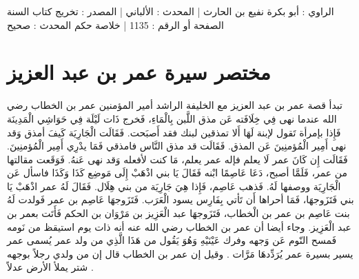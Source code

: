 الراوي : أبو بكرة نفيع بن الحارث | المحدث : الألباني | المصدر : تخريج كتاب السنة
الصفحة أو الرقم : 1135 | خلاصة حكم المحدث : صحيح 

\section{مختصر سيرة عمر بن عبد العزيز}

تبدأ قصة عمر بن عبد العزيز مع الخليفة الراشد أمير المؤمنين عمر بن الخطاب رضي الله عندما نهى فِي خِلَافَته عَن مذق اللَّبن بِالْمَاءِ، فَخرج ذَات لَيْلَة فِي حَوَاشِي الْمَدِينَة فَإِذا بإمرأة تَقول لإبنة لَهَا أَلا تمذقين لبنك فقد أَصبَحت. فَقَالَت الْجَارِيَة كَيفَ أمذق وَقد نهى أَمِير الْمُؤمنِينَ عَن المذق. فَقَالَت قد مذق النَّاس فامذقي فَمَا يدْرِي أَمِير الْمُؤمنِينَ. فَقَالَت إِن كَانَ عمر لَا يعلم فإله عمر يعلم، مَا كنت لأفعله وَقد نهى عَنهُ. فَوَقَعت مقالتها من عمر، فَلَمَّا أصبح، دَعَا عَاصِمًا ابْنه فَقَالَ يَا بني اذْهَبْ إِلَى مَوضِع كَذَا وَكَذَا فاسأل عَن الْجَارِيَة ووصفها لَهُ. فَذهب عَاصِم، فَإِذا هِيَ جَارِيَة من بني هِلَال. فَقَالَ لَهُ عمر اذْهَبْ يَا بني فَتَزَوجهَا، فَمَا أحراها أَن تَأتي بِفَارِس يسود الْعَرَب. فَتَزَوجهَا عَاصِم بن عمر فَولدت لَهُ بنت عَاصِم بن عمر بن الْخطاب، فَتَزَوجهَا عبد الْعَزِيز بن مَرْوَان بن الحكم فَأَتَت بعمر بن عبد الْعَزِيز. وجاء أيضا أن عمر بن الخطاب رضي الله عنه أنه ذات يوم استيقظ من نَومه فَمسح النّوم عَن وَجهه وفرك عَيْنَيْهِ وَهُوَ يَقُول من هَذَا الَّذِي من ولد عمر يُسمى عمر يسير بسيرة عمر يُرَدِّدهَا مَرَّات \cite{ibnAbdAlHakam_OmarIbnAbdAlAziz}. وقيل إن عمر بن الخطاب قال إن من ولدي رجلاً بوجهه شتر يملأ الأرض عدلاً \cite{dahabi_Siyar}.

